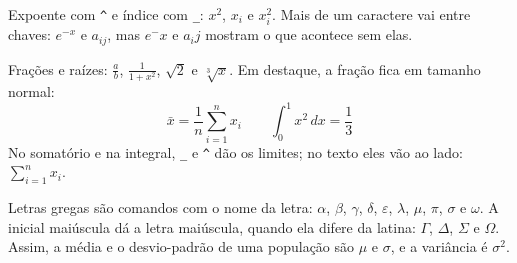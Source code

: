 \documentclass[a4paper]{article}
\begin{document}
Expoente com \verb|^| e índice com \verb|_|: $x^2$, $x_i$ e $x_i^2$. Mais
de um caractere vai entre chaves: $e^{-x}$ e $a_{ij}$, mas $e^-x$ e
$a_ij$ mostram o que acontece sem elas.

Frações e raízes: $\frac{a}{b}$, $\frac{1}{1+x^2}$, $\sqrt{2}$ e
$\sqrt[3]{x}$. Em destaque, a fração fica em tamanho normal:
\[
  \bar{x} = \frac{1}{n} \sum_{i=1}^{n} x_i
  \qquad
  \int_{0}^{1} x^2 \, dx = \frac{1}{3}
\]
No somatório e na integral, \verb|_| e \verb|^| dão os limites; no
texto eles vão ao lado: $\sum_{i=1}^{n} x_i$.

\clearpage

Letras gregas são comandos com o nome da letra: $\alpha$, $\beta$,
$\gamma$, $\delta$, $\varepsilon$, $\lambda$, $\mu$, $\pi$, $\sigma$ e
$\omega$. A inicial maiúscula dá a letra maiúscula, quando ela difere da
latina: $\Gamma$, $\Delta$, $\Sigma$ e $\Omega$. Assim, a média e o
desvio-padrão de uma população são $\mu$ e $\sigma$, e a variância é
$\sigma^2$.
\end{document}
